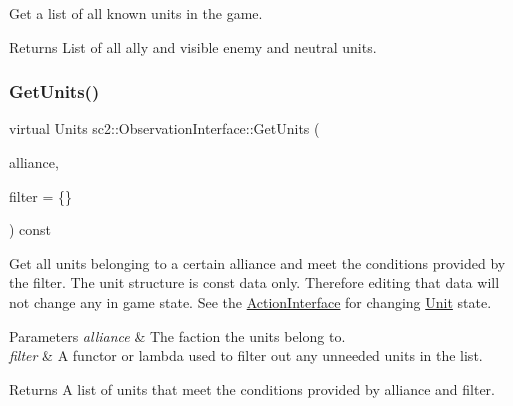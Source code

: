 Get a list of all known units in the game. \begin{DoxyReturn}{Returns}
List of all ally and visible enemy and neutral units. 
\end{DoxyReturn}
\mbox{\label{classsc2_1_1_observation_interface_aa43cfa17a9ac893500bce33eb41e6171}} 
\subsubsection{\texorpdfstring{Get\+Units()}{GetUnits()}\hspace{0.1cm}{\footnotesize\ttfamily [2/3]}}
{\footnotesize\ttfamily virtual Units sc2\+::\+Observation\+Interface\+::\+Get\+Units (\begin{DoxyParamCaption}\item[{\hyperlink{classsc2_1_1_unit_a5a40e672e7599d73ef8ef5758bbd7461}{Unit\+::\+Alliance}}]{alliance,  }\item[{\hyperlink{sc2__interfaces_8h_a5cc3d9751182ccd2b085f3e272bcc88b}{Filter}}]{filter = {\ttfamily \{\}} }\end{DoxyParamCaption}) const\hspace{0.3cm}{\ttfamily [pure virtual]}}

Get all units belonging to a certain alliance and meet the conditions provided by the filter. The unit structure is const data only. Therefore editing that data will not change any in game state. See the \hyperlink{classsc2_1_1_action_interface}{Action\+Interface} for changing \hyperlink{classsc2_1_1_unit}{Unit} state. 
\begin{DoxyParams}{Parameters}
{\em alliance} & The faction the units belong to. \\
\hline
{\em filter} & A functor or lambda used to filter out any unneeded units in the list. \\
\hline
\end{DoxyParams}
\begin{DoxyReturn}{Returns}
A list of units that meet the conditions provided by alliance and filter. 
\end{DoxyReturn}
\mbox{\label{classsc2_1_1_observation_interface_ab0d22edc6bd276b8e9d27387294fdc88}} 
